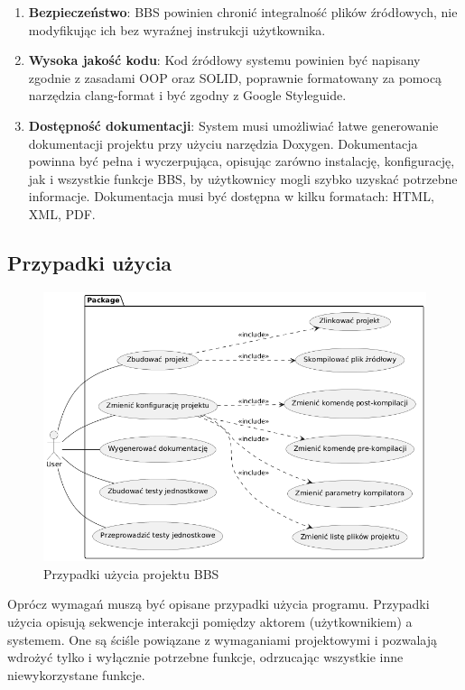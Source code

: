 \begin{enumerate}
    \item \textbf{Bezpieczeństwo}: BBS powinien chronić integralność plików źródłowych, nie modyfikując ich bez wyraźnej instrukcji użytkownika.
    \item \textbf{Wysoka jakość kodu}: Kod źródłowy systemu powinien być napisany zgodnie z zasadami OOP oraz SOLID, poprawnie formatowany za pomocą narzędzia clang-format i być zgodny z Google Styleguide.
    \item \textbf{Dostępność dokumentacji}: System musi umożliwiać łatwe generowanie dokumentacji projektu przy użyciu narzędzia Doxygen. Dokumentacja powinna być pełna i wyczerpująca, opisując zarówno instalację, konfigurację, jak i wszystkie funkcje BBS, by użytkownicy mogli szybko uzyskać potrzebne informacje. Dokumentacja musi być dostępna w kilku formatach: HTML, XML, PDF.
\end{enumerate}

\subsection{Przypadki użycia}
\begin{figure}[h]
    \centering
    \includegraphics[width=\textwidth]{Images/use-case.png}
    \caption{Przypadki użycia projektu BBS}
\end{figure}

Oprócz wymagań muszą być opisane przypadki użycia programu. Przypadki użycia opisują sekwencje interakcji pomiędzy aktorem (użytkownikiem) a systemem. One są ściśle powiązane z wymaganiami projektowymi i pozwalają wdrożyć tylko i wyłącznie potrzebne funkcje, odrzucając wszystkie inne niewykorzystane funkcje.

